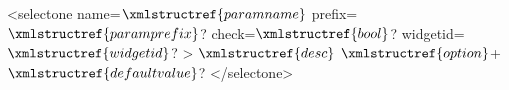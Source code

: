<selectone name=$\xmlstructref{paramname}$ prefix=$\xmlstructref{paramprefix}$? check=$\xmlstructref{bool}$? widgetid=$\xmlstructref{widgetid}$? >
  $\xmlstructref{desc}$
  $\xmlstructref{option}$+
  $\xmlstructref{defaultvalue}$?
</selectone>
